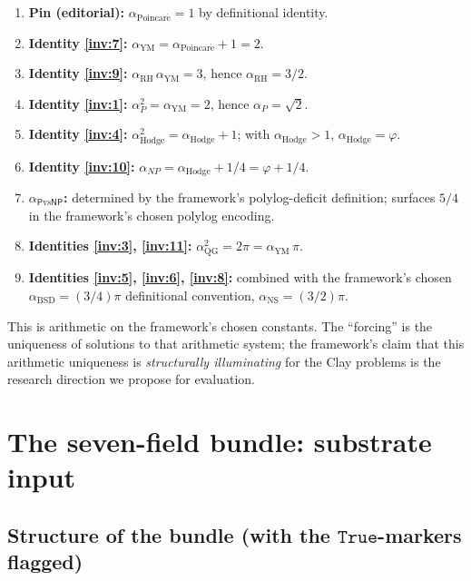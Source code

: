 \documentclass[11pt,a4paper]{article}
\theoremstyle{plain}
\theoremstyle{definition}
\begin{document}
\begin{enumerate}[leftmargin=*,nosep]
\item \textbf{Pin (editorial):}
  $\alpha_{\mathrm{Poincar\acute e}} = 1$ by definitional
  identity.
\item \textbf{Identity \eqref{inv:7}:}
  $\alpha_{\mathrm{YM}} = \alpha_{\mathrm{Poincar\acute e}} + 1
  = 2$.
\item \textbf{Identity \eqref{inv:9}:}
  $\alpha_{\mathrm{RH}}\,\alpha_{\mathrm{YM}} = 3$, hence
  $\alpha_{\mathrm{RH}} = 3/2$.
\item \textbf{Identity \eqref{inv:1}:}
  $\alpha_{P}^{2} = \alpha_{\mathrm{YM}} = 2$, hence
  $\alpha_{P} = \sqrt{2}$.
\item \textbf{Identity \eqref{inv:4}:}
  $\alpha_{\mathrm{Hodge}}^{2} = \alpha_{\mathrm{Hodge}} + 1$;
  with $\alpha_{\mathrm{Hodge}} > 1$, $\alpha_{\mathrm{Hodge}} =
  \varphi$.
\item \textbf{Identity \eqref{inv:10}:}
  $\alpha_{NP} = \alpha_{\mathrm{Hodge}} + 1/4 = \varphi + 1/4$.
\item \textbf{$\alpha_{\mathsf{P}\mathrm{vs}\mathsf{NP}}$:}
  determined by the framework's polylog-deficit definition;
  surfaces $5/4$ in the framework's chosen polylog encoding.
\item \textbf{Identities \eqref{inv:3}, \eqref{inv:11}:}
  $\alpha_{\mathrm{QG}}^{2} = 2\pi = \alpha_{\mathrm{YM}}\,\pi$.
\item \textbf{Identities \eqref{inv:5}, \eqref{inv:6},
  \eqref{inv:8}:} combined with the framework's chosen
  $\alpha_{\mathrm{BSD}} = (3/4)\pi$ definitional convention,
  $\alpha_{\mathrm{NS}} = (3/2)\pi$.
\end{enumerate}

This is arithmetic on the framework's chosen constants. The
``forcing'' is the uniqueness of solutions to that arithmetic
system; the framework's claim that this arithmetic uniqueness is
\emph{structurally illuminating} for the Clay problems is the
research direction we propose for evaluation.

\section{The seven-field bundle: substrate input}
\label{sec:bundle}

\subsection{Structure of the bundle (with the
$\mathtt{True}$-markers flagged)}
\label{sec:bundle-def}
\end{document}
